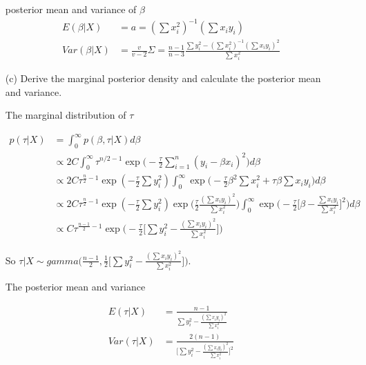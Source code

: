 \begin{itemize}
posterior mean and variance of $\beta$
\begin{align*}
	E(\beta|X) &= a = (\sum x_i^2)^{-1} (\sum x_i y_i)\\
	Var(\beta|X)&= \frac{v}{v-2} \Sigma = \frac{n-1}{n-3} \frac{\sum y_i^2 - (\sum x_i^2)^{-1} (\sum x_i y_i)^2 }{\sum x_i^2}
\end{align*}	

\item[(c)] Derive the marginal posterior density and calculate the posterior mean and variance.

The marginal distribution of $\tau$ 

\begin{align*}
	p(\tau |X) &= \int_{0}^{\infty} p(\beta, \tau |X) d \beta \\
	& \propto 2 C \int_{0}^{\infty}  {\tau^{n/2-1}} \exp \Big(-\frac{\tau}{2} \sum_{i=1}^n (y_i-\beta x_i)^2 \Big) d\beta \\
	& \propto 2C \tau^{\frac{n}{2}-1} \exp(-\frac{\tau}{2} \sum y_i^2) \int_0^{\infty} \exp \Big( -\frac{\tau}{2} \beta^2 \sum x_i^2 + \tau \beta \sum x_i y_i \Big) d\beta \\
	& \propto 2C \tau^{\frac{n}{2}-1} \exp(-\frac{\tau}{2} \sum y_i^2) \exp \Big( \frac{\tau}{2} \frac{(\sum x_i y_i)^2}{\sum x_i^2} \Big) \int_0^{\infty} \exp \Big( -\frac{\tau}{2} \Big[ \beta - \frac{\sum x_i y_i}{\sum x_i^2} \Big]^2 \Big) d\beta \\
	& \propto  C \tau^{\frac{n-1}{2}-1} \exp \Big(-\frac{\tau}{2} \Big[ \sum y_i^2 - \frac{(\sum x_i y_i)^2}{\sum x_i^2}\Big] \Big) 
\end{align*}

So $\tau|X \sim gamma \Big(\frac{n-1}{2}, \frac{1}{2} \Big[ \sum y_i^2 - \frac{(\sum x_i y_i)^2}{\sum x_i^2}\Big] \Big)$.

The posterior mean and variance

\begin{align*}
	E(\tau |X) &= \frac{n-1 }{ \sum y_i^2 - \frac{(\sum x_i y_i)^2}{\sum x_i^2}} \\
	Var(\tau |X) &= \frac{2(n-1) }{ \Big[ \sum y_i^2 - \frac{(\sum x_i y_i)^2}{\sum x_i^2}\Big]^2}
\end{align*}

\end{itemize}

